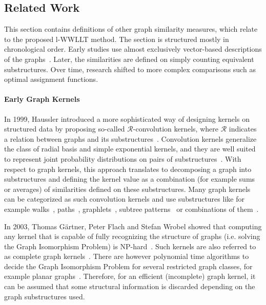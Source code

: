     \subsection{Related Work} \label{subsec:related_work}
    	
    	This section contains definitions of other graph similarity measures, which relate to the proposed l-WWLLT method.
    	The section is structured mostly in chronological order.
    	Early studies use almost exclusively vector-based descriptions of the graphs~\cite{2005_Borgwardt_IEEE}.
    	Later, the similarities are defined on simply counting equivalent substructures.	
    	Over time, research shifted to more complex comparisons such as optimal assignment functions.
    	
	    \paragraph{Early Graph Kernels}
		In 1999, Haussler introduced a more sophisticated way of designing kernels on structured data by proposing so-called $\mathcal{R}$-convolution kernels, where $\mathcal{R}$ indicates a relation between graphs and its substructures~\cite{1999_Haussler_CONF, 2003_Kashima_ICML, 2019_Togninalli_NIPS}.
		Convolution kernels generalize the class of radial basis and simple exponential kernels, and they are well suited to represent joint probability distributions on pairs of substructures~\cite{1999_Haussler_CONF}.
		With respect to graph kernels, this approach translates to decomposing a graph into substructures and defining the kernel value as a combination (for example sums or averages) of similarities defined on these substructures.
		Many graph kernels can be categorized as such convolution kernels and use substructures like for example walks~\cite{2003_Gaertner_CONF,2003_Kashima_ICML}, paths~\cite{2005_Borgwardt_IEEE}, graphlets~\cite{2004_Horvath_KDD, 2009_Shervashidze_NIPS}, subtree patterns~\cite{2003_Ramon_CONF, 2008_Mahe_CONF} or combinations of them~\cite{2011_Shervashidze_JMLR}.
								
		In 2003, Thomas Gärtner, Peter Flach and Stefan Wrobel showed that computing any kernel that is capable of fully recognizing the structure of graphs (i.e. solving the Graph Isomorphism Problem) is NP-hard~\cite{2003_Gaertner_CONF}.
		Such kernels are also referred to as complete graph kernels~\cite{2003_Ramon_CONF}.
		There are however polynomial time algorithms to decide the Graph Isomorphism Problem for several restricted graph classes, for example planar graphs~\cite{2012_Kobler_BOOK}.
		Therefore, for an efficient (incomplete) graph kernel, it can be assumed that some structural information is discarded depending on the graph substructures used.

